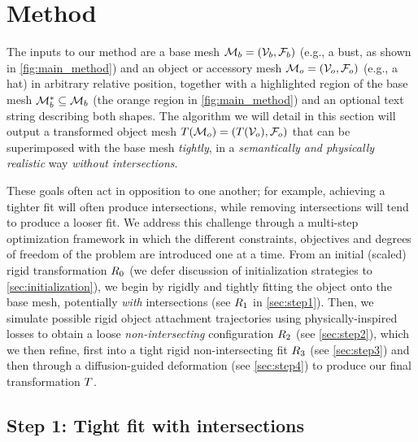 
\section{Method} 
\label{sec:method}
\vspace{-2mm}
The inputs to our method are a base mesh $\mathcal{M}_b = (\mathcal{V}_b, \mathcal{F}_b)$ (e.g., a bust, as shown in \autoref{fig:main_method}) and an object or accessory mesh $\mathcal{M}_o = (\mathcal{V}_o, \mathcal{F}_o)$ (e.g., a hat) in arbitrary relative position, together with a highlighted region of the base mesh $\mathcal{M}_b^* \subseteq \mathcal{M}_b$ (the orange region in \autoref{fig:main_method}) and an optional text string describing both shapes.
The algorithm we will detail in this section will output a transformed object mesh $T (\mathcal{M}_o) = (T (\mathcal{V}_o), \mathcal{F}_o)$ that can be superimposed with the base mesh \emph{tightly}, in a \emph{semantically and physically realistic} way \emph{without intersections}.



These goals often act in opposition to one another; for example, achieving a tighter fit will often produce intersections, while removing intersections will tend to produce a looser fit.
We address this challenge through a multi-step optimization framework in which the different constraints, objectives and degrees of freedom of the problem are introduced one at a time.
From an initial (scaled) rigid transformation $R_0$ (we defer discussion of initialization strategies to \autoref{sec:initialization}), we begin by rigidly and tightly fitting the object onto the base mesh, potentially \emph{with} intersections (see $R_1$ in \autoref{sec:step1}).
Then, we simulate possible rigid object attachment trajectories using physically-inspired losses to obtain a loose \emph{non-intersecting} configuration $R_2$ (see \autoref{sec:step2}), which we then refine, first into a tight rigid non-intersecting fit $R_3$ (see \autoref{sec:step3}) and then through a diffusion-guided deformation (see \autoref{sec:step4}) to produce our final transformation $T$.


\subsection{Step 1: Tight fit with intersections}
\label{sec:step1}



